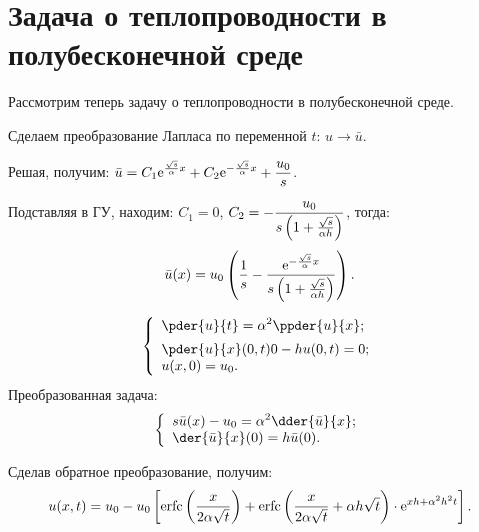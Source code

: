 \section{Задача о теплопроводности в полубесконечной среде}
\begin{minipage}{.6\textwidth}
    Рассмотрим теперь задачу о теплопроводности в полубесконечной среде.

    Сделаем преобразование Лапласа по переменной \( t \): \( u \to \bar{u} \).
        
    Решая, получим: \( \displaystyle \bar{u} = C_1\mathrm{e}^{\frac{\sqrt{s}}{\alpha}x} +
    C_2\mathrm{e}^{-\frac{\sqrt{s}}{\alpha}x} + \frac{u_0}{s} \).

    Подставляя в ГУ, находим: \( C_1 = 0 \), \( \displaystyle C_2 =
    -\frac{u_0}{s\left(1 + \frac{\sqrt{s}}{\alpha h}\right)} \), тогда:
    \[
        \bar{u}(x) = u_0\left(\frac{1}{s} - \frac{\mathrm{e}^{-\frac{\sqrt{s}}
        {\alpha}x}}{s\left(1 + \frac{\sqrt{s}}{\alpha h}\right)}\right).
    \]
\end{minipage}
\hfill
\begin{minipage}{.3\textwidth}
    \flushright
    \[
        \left\{ \begin{array}{l}
            \ds \pder{u}{t} = \alpha^2 \ppder{u}{x}; \\[.5em]
            \ds \pder{u}{x}(0,t) 0 - hu(0, t) = 0; \\
            u(x, 0) = u_0.
        \end{array} \right.
    \]
    Преобразованная задача:
    \[
        \left\{ \begin{array}{l}
            \ds s\bar{u}(x) - u_0 = \alpha^2\dder{\bar{u}}{x}; \\
            \ds \der{\bar{u}}{x}(0) = h\bar{u}(0).
        \end{array} \right.
    \]
\end{minipage}

Сделав обратное преобразование, получим:
\[
    u(x, t) = u_0 - u_0\left[\mathrm{erfc}\left(\frac{x}{2\alpha\sqrt{t}}\right) + 
    \mathrm{erfc}\left(\frac{x}{2\alpha\sqrt{t}} + \alpha h\sqrt{t}\right)\cdot
    \mathrm{e}^{xh + \alpha^2h^2 t}\right].
\]

\newpage
